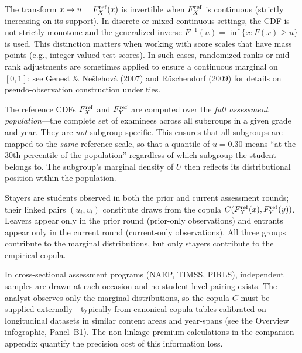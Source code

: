 \documentclass[10pt]{article}
\newlength{\fnlabelwidth}
\newcommand{\fnline}[2]{%
  \par\noindent
  \makebox[\fnlabelwidth][l]{$^{#1}$}%
  \parbox[t]{\dimexpr\linewidth-\fnlabelwidth\relax}{#2}%
  \par
}
\begin{document}
\noindent
\hspace{0.45in}%
\begin{minipage}[t]{7.5in}
\footnotesize\raggedright
\setlength{\parskip}{0pt}

\fnline{1}{The transform $x \mapsto u = F_X^{\mathrm{ref}}(x)$ is invertible when $F_X^{\mathrm{ref}}$
is continuous (strictly increasing on its support). In discrete or
mixed-continuous settings, the CDF is not strictly monotone and the
generalized inverse $F^{-1}(u) = \inf\{x : F(x) \ge u\}$ is used.
This distinction matters when working with score scales that have mass
points (e.g., integer-valued test scores). In such cases, randomized
ranks or mid-rank adjustments are sometimes applied to ensure a
continuous marginal on $[0,1]$; see Genest \& Ne\v{s}lehov\'{a} (2007)
and R\"{u}schendorf (2009) for details on pseudo-observation
construction under ties.}

\vspace{4pt}
\fnline{2}{The reference CDFs $F_X^{\mathrm{ref}}$ and $F_Y^{\mathrm{ref}}$ are computed over the
\emph{full assessment population}---the complete set of examinees
across all subgroups in a given grade and year. They are \emph{not}
subgroup-specific. This ensures that all subgroups are mapped to
the \emph{same} reference scale, so that a quantile of $u = 0.30$
means ``at the 30th percentile of the population'' regardless of
which subgroup the student belongs to. The subgroup's marginal
density of $U$ then reflects its distributional position within
the population.}

\vspace{4pt}
\fnline{3}{Stayers are students observed in both the prior and current
assessment rounds; their linked pairs $(u_i, v_i)$ constitute
draws from the copula $C(F_X^{\mathrm{ref}}(x), F_Y^{\mathrm{ref}}(y))$. Leavers appear
only in the prior round (prior-only observations) and entrants
appear only in the current round (current-only observations).
All three groups contribute to the marginal distributions, but
only stayers contribute to the empirical copula.}

\vspace{4pt}
\fnline{4}{In cross-sectional assessment programs (NAEP, TIMSS, PIRLS),
independent samples are drawn at each occasion and no student-level
pairing exists. The analyst observes only the marginal distributions,
so the copula $C$ must be supplied externally---typically from
canonical copula tables calibrated on longitudinal datasets in
similar content areas and year-spans (see the Overview infographic,
Panel~B1). The non-linkage premium calculations in the companion
appendix quantify the precision cost of this information loss.}

\end{minipage}
\end{document}
